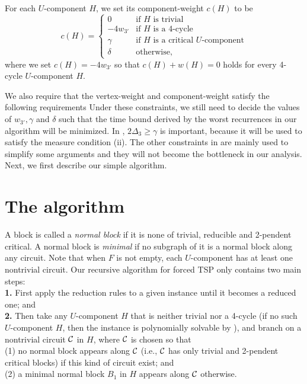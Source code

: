 \documentclass[runningheads]{llncs}
\begin{document}
\vspace{-0mm}\vspace{-0mm}

For each $U$-component $H$, we set its component-weight $c(H)$  to be
\[ c(H)
=\left\{ \begin{array}{cl}
 0 & \mbox{if  $H$ is trivial}\\
 -4w_{3'} & \mbox{if $H$ is a 4-cycle}\\
 \gamma & \mbox{if $H$ is a critical $U$-component}\\
 \delta  & \mbox{otherwise,}   \end{array}
\right.\]
where we set $c(H)=-4w_{3'}$ so that $c(H)+w(H)=0$ holds for
every 4-cycle $U$-component $H$.

We also require that the vertex-weight and component-weight satisfy the following requirements
Under these constraints, we still need to decide the values of $w_{3'}, \gamma$ and $\delta$ such that the time bound
derived by the worst recurrences in our algorithm will be minimized.
In , $2\Delta_3 \geq \gamma$ is important, because it will be used to satisfy the measure condition (ii).
The other constraints in  are mainly used to simplify some arguments and they will not become the bottleneck in our analysis.
Next, we first describe our simple algorithm.

\section{The algorithm}
A block is called a \emph{normal block} if it is none of trivial, reducible and 2-pendent critical.
A normal block is \emph{minimal} if no subgraph of it is a normal block along any circuit.
Note that when $F$ is not empty, each $U$-component has at least one nontrivial circuit.
Our recursive algorithm for forced TSP  only contains two main steps:\\
{\bf 1.} First apply the reduction rules to a given
instance until it becomes a reduced one; and \\
{\bf 2.} Then take any $U$-component $H$ that is neither trivial nor a 4-cycle
(if no such $U$-component $H$, then the instance is polynomially solvable
by ),
 and branch on a nontrivial circuit ${\cal C}$ in $H$, where
${\cal C}$ is chosen so that \\
(1) no normal block appears along ${\cal C}$
(i.e., ${\cal C}$ has only trivial and 2-pendent critical blocks)  if this kind of circuit exist;
 and \\
(2)  a minimal normal
 block $B_1$ in $H$ appears along ${\cal C}$  otherwise.
\end{document}
